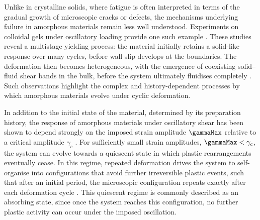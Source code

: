 \documentclass[asymmetricmargins]{library/duthesis}%
\providecommand{\DIFdelbegin}{} %
\begin{document}
Unlike in crystalline solids, where fatigue is often interpreted in terms of the gradual growth of microscopic cracks or defects, the mechanisms underlying failure in amorphous materials remain less well understood. Experiments on colloidal gels under oscillatory loading provide one such example \cite{Perge2014,Gibaud2016,SaintMichel2017}. These studies reveal a multistage yielding process: the material initially retains a solid-like response over many cycles, before wall slip develops at the boundaries. The deformation then becomes heterogeneous, with the emergence of coexisting solid–fluid shear bands in the bulk, before the system ultimately fluidises completely \cite{Gibaud2016}. Such observations highlight the complex and history-dependent processes by which amorphous materials evolve under cyclic deformation.

In addition to the initial state of the material, determined by its preparation history, the response of amorphous materials under oscillatory shear has been shown to depend strongly on the imposed strain amplitude $\gammaMax$ relative to a critical amplitude $\gamma_c$ \cite{bhaumikRoleAnnealingDetermining2021,Cort2008,Das2020,Fiocco2013,kawasakiMacroscopicYieldingJammed2016,KhirallahIntegerModel2021,knowltonMicroscopicViewYielding2014,kumarMappingOutGlassy2022,lavrentovichPeriodProliferationPeriodic2017,bhardwajSituClickChemistry2017,liuFateShearoscillatedAmorphous2022,munganMetastabilityMechanismYielding2021,himanagamanasaExperimentalSignaturesNonequilibrium2014,nessAbsorbingStateTransitionsGranular2020,pineChaosThresholdIrreversibility2005,priezjevMolecularDynamicsSimulations2018,Regev_onset_2013,sastryModelsYieldingBehavior2021,szulcForcedDeterministicDynamics2020,yehGlassStabilityChanges2020}. For sufficiently small strain amplitudes, $\gammaMax < \gamma_c$, the system can evolve towards a quiescent state in which plastic rearrangements eventually cease. In this regime, repeated deformation drives the system to self-organise into configurations that avoid further irreversible plastic events, such that after an initial period, the microscopic configuration repeats exactly after each deformation cycle \cite{Regev_onset_2013,kawasakiMacroscopicYieldingJammed2016,Leishangthem2017}. This quiescent regime is commonly described as an absorbing state, since once the system reaches this configuration, no further plastic activity can occur under the imposed oscillation. \DIFdelbegin %
\end{document}
